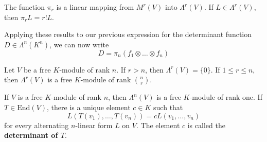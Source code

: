 \begin{lemma}
	The function $\pi_r$ is a linear mapping from $M^r(V)$ into $\Lambda^r(V)$. If $L \in \Lambda^r(V)$, then $\pi_r L = r! L$.
\end{lemma}

Applying these results to our previous expression for the determinant function $D \in \Lambda^n(K^n)$, we can now write
\[
	D = \pi_n (f_1 \otimes \ldots \otimes f_n)
\]

\begin{theorem}
	Let $V$ be a free $K$-module of rank $n$. If $r > n$, then $\Lambda^r(V) = \{ 0 \}$. If $1 \leq r \leq n$, then $\Lambda^r(V)$ is a free $K$-module of rank $\binom{n}{r}$.
\end{theorem}

\begin{corollary}
	If $V$ is a free $K$-module of rank $n$, then $\Lambda^n(V)$ is a free $K$-module of rank one. If $T \in \text{End}(V)$, there is a unique element $c \in K$ such that
	\[
		L(T(v_1), \ldots, T(v_n)) = cL(v_1, \ldots, v_n)
	\]
	for every alternating $n$-linear form $L$ on $V$. The element $c$ is called the \textbf{determinant of $T$}.
\end{corollary}